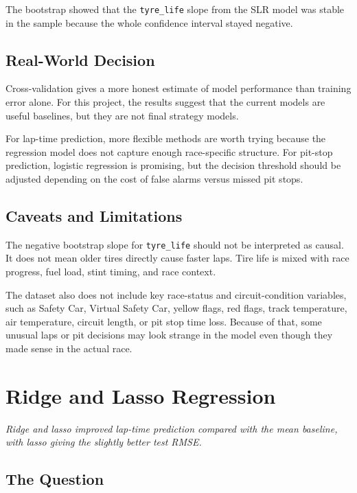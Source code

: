 \documentclass[11pt,oneside,openany]{book}
\newcommand{\chapterquote}[1]{%
\begin{center}
\small\textit{#1}
\end{center}
\vspace{-0.5em}
}
\begin{document}
The bootstrap showed that the \texttt{tyre\_life} slope from the SLR model was stable in the sample because the whole confidence interval stayed negative.

\section{Real-World Decision}

Cross-validation gives a more honest estimate of model performance than training error alone. For this project, the results suggest that the current models are useful baselines, but they are not final strategy models.

For lap-time prediction, more flexible methods are worth trying because the regression model does not capture enough race-specific structure. For pit-stop prediction, logistic regression is promising, but the decision threshold should be adjusted depending on the cost of false alarms versus missed pit stops.

\section{Caveats and Limitations}

The negative bootstrap slope for \texttt{tyre\_life} should not be interpreted as causal. It does not mean older tires directly cause faster laps. Tire life is mixed with race progress, fuel load, stint timing, and race context.

The dataset also does not include key race-status and circuit-condition variables, such as Safety Car, Virtual Safety Car, yellow flags, red flags, track temperature, air temperature, circuit length, or pit stop time loss. Because of that, some unusual laps or pit decisions may look strange in the model even though they made sense in the actual race.


\chapter{Ridge and Lasso Regression}
\chapterquote{Ridge and lasso improved lap-time prediction compared with the mean baseline, with lasso giving the slightly better test RMSE.}

\section{The Question}
\end{document}
